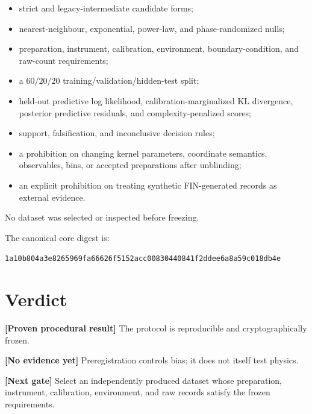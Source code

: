 \documentclass[11pt,a4paper,openany]{report}
\begin{document}
\begin{itemize}
\item 
strict and legacy-intermediate candidate forms;

\item 
nearest-neighbour, exponential, power-law, and phase-randomized nulls;

\item 
preparation, instrument, calibration, environment, boundary-condition, and raw-count requirements;

\item 
a \(60/20/20\) training/\allowbreak{}validation/\allowbreak{}hidden-test split;

\item 
held-out predictive log likelihood, calibration-marginalized KL divergence, posterior predictive residuals, and complexity-penalized scores;

\item 
support, falsification, and inconclusive decision rules;

\item 
a prohibition on changing kernel parameters, coordinate semantics, observables, bins, or accepted preparations after unblinding;

\item 
an explicit prohibition on treating synthetic FIN-generated records as external evidence.

\end{itemize}

No dataset was selected or inspected before freezing.

The canonical core digest is:

\texttt{1a10b804a3e82659}\allowbreak\texttt{69fa66626f5152ac}\allowbreak\texttt{c00830440841f2dd}\allowbreak\texttt{ee6a8a59c018db4e}

\section{Verdict}

\textbf{[Proven procedural result]} The protocol is reproducible and cryptographically frozen.

\textbf{[No evidence yet]} Preregistration controls bias; it does not itself test physics.

\textbf{[Next gate]} Select an independently produced dataset whose preparation, instrument, calibration, environment, and raw records satisfy the frozen requirements.
\end{document}
